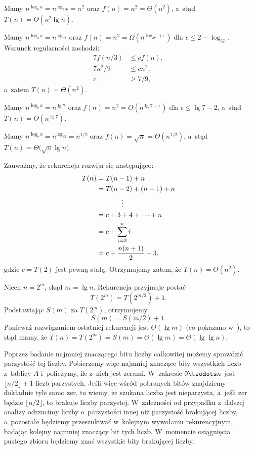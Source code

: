 \subproblem %
Mamy $n^{\log_ba}=n^{\log_416}=n^2$ oraz $f(n)=n^2=\Theta(n^2)$, a~stąd $T(n)=\Theta(n^2\lg n)$.

\subproblem %
Mamy $n^{\log_ba}=n^{\log_37}$ oraz $f(n)=n^2=\Omega(n^{\log_37+\epsilon})$ dla $\epsilon\le2-\log_37$.
Warunek regularności zachodzi:
\begin{align*}
	7f(n/3) &\le cf(n), \\
	7n^2\!/9 &\le cn^2, \\
	c &\ge 7/9,
\end{align*}
a~zatem $T(n)=\Theta(n^2)$.

\subproblem %
Mamy $n^{\log_ba}=n^{\lg7}$ oraz $f(n)=n^2=O(n^{\lg7-\epsilon})$ dla $\epsilon\le\lg7-2$, a~stąd $T(n)=\Theta(n^{\lg7})$.

\subproblem %
Mamy $n^{\log_ba}=n^{\log_42}=n^{1/2}$ oraz $f(n)=\sqrt{n}=\Theta(n^{1/2})$, a~stąd $T(n)=\Theta\bigl(\!\sqrt{n}\lg n\bigr)$.

\subproblem %
Zauważmy, że rekurencja rozwija się następująco:
\begin{align*}
	T(n) &= T(n-1)+n \\
	&= T(n-2)+(n-1)+n \\
	&\hspace{.5in}\vdots \\
	&= c+3+4+\dots+n \\
	&= c+\sum_{i=3}^ni \\
	&= c+\frac{n(n+1)}{2}-3,
\end{align*}
gdzie $c=T(2)$ jest pewną stałą.
Otrzymujemy zatem, że $T(n)=\Theta(n^2)$.

\subproblem %
Niech $n=2^m$, skąd $m=\lg n$.
Rekurencja przyjmuje postać
\[
	T(2^m) = T(2^{m/2})+1.
\]
Podstawiając $S(m)$ za $T(2^m)$, otrzymujemy
\[
	S(m) = S(m/2)+1.
\]
Ponieważ rozwiązaniem ostatniej rekurencji jest $\Theta(\lg m)$ (co pokazano w~), to stąd mamy, że $T(n)=T(2^m)=S(m)=\Theta(\lg m)=\Theta(\lg\lg n)$.

Poprzez badanie najmniej znaczącego bitu liczby całkowitej możemy sprawdzić parzystość tej liczby.
Pobierzemy więc najmniej znaczące bity wszystkich liczb z~tablicy $A$ i~policzymy, ile z~nich jest zerami.
W~zakresie $0\twodots n$ jest $\lfloor n/2\rfloor+1$ liczb parzystych.
Jeśli więc wśród pobranych bitów znajdziemy dokładnie tyle samo zer, to wiemy, że szukana liczba jest nieparzysta, a~jeśli zer będzie $\lfloor n/2\rfloor$, to brakuje liczby parzystej.
W~zależności od przypadku z~dalszej analizy odrzucimy liczby o~parzystości innej niż parzystość brakującej liczby, a~pozostałe będziemy przeszukiwać w~kolejnym wywołaniu rekurencyjnym, badając kolejny najmniej znaczący bit tych liczb.
W~momencie osiągnięcia pustego zbioru będziemy znać wszystkie bity brakującej liczby.

